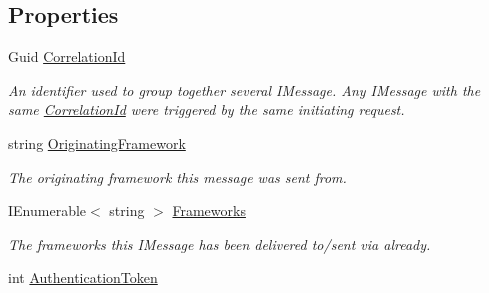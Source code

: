\subsection*{Properties}
\begin{DoxyCompactItemize}
\item 
Guid \hyperlink{classCqrs_1_1MongoDB_1_1Tests_1_1Integration_1_1MongoDbSnapshotStoreTests_1_1RandomNumberEvent_aeacd08664adc8a710515e74bb7ff853c_aeacd08664adc8a710515e74bb7ff853c}{Correlation\+Id}
\begin{DoxyCompactList}\small\item\em An identifier used to group together several I\+Message. Any I\+Message with the same \hyperlink{classCqrs_1_1MongoDB_1_1Tests_1_1Integration_1_1MongoDbSnapshotStoreTests_1_1RandomNumberEvent_aeacd08664adc8a710515e74bb7ff853c_aeacd08664adc8a710515e74bb7ff853c}{Correlation\+Id} were triggered by the same initiating request. \end{DoxyCompactList}\item 
string \hyperlink{classCqrs_1_1MongoDB_1_1Tests_1_1Integration_1_1MongoDbSnapshotStoreTests_1_1RandomNumberEvent_aaa6a62ba7e25079027da58692a9e0578_aaa6a62ba7e25079027da58692a9e0578}{Originating\+Framework}
\begin{DoxyCompactList}\small\item\em The originating framework this message was sent from. \end{DoxyCompactList}\item 
I\+Enumerable$<$ string $>$ \hyperlink{classCqrs_1_1MongoDB_1_1Tests_1_1Integration_1_1MongoDbSnapshotStoreTests_1_1RandomNumberEvent_a3af56ebbe4f98410ba79647f08ba31f3_a3af56ebbe4f98410ba79647f08ba31f3}{Frameworks}
\begin{DoxyCompactList}\small\item\em The frameworks this I\+Message has been delivered to/sent via already. \end{DoxyCompactList}\item 
int \hyperlink{classCqrs_1_1MongoDB_1_1Tests_1_1Integration_1_1MongoDbSnapshotStoreTests_1_1RandomNumberEvent_a4eb62ec3a36f874fcd05b3934ceeb646_a4eb62ec3a36f874fcd05b3934ceeb646}{Authentication\+Token}

\end{DoxyCompactItemize}
